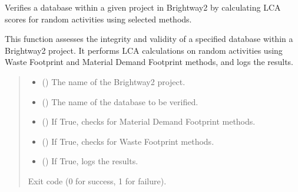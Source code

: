 \documentclass[letterpaper,10pt,english]{sphinxmanual}
\begin{document}
\begin{fulllineitems}
\label{\detokenize{WMFootprint_api:WasteAndMaterialFootprint.VerifyDatabase.VerifyDatabase}}
\pysigstartsignatures
{}
\pysigstopsignatures
\sphinxAtStartPar
Verifies a database within a given project in Brightway2 by calculating LCA scores
for random activities using selected methods.

\sphinxAtStartPar
This function assesses the integrity and validity of a specified database within a Brightway2 project.
It performs LCA calculations on random activities using Waste Footprint and Material Demand Footprint methods,
and logs the results.
\begin{quote}\begin{description}
\begin{itemize}
\item {} 
\sphinxAtStartPar
{} () \textendash{} The name of the Brightway2 project.

\item {} 
\sphinxAtStartPar
{} () \textendash{} The name of the database to be verified.

\item {} 
\sphinxAtStartPar
{} () \textendash{} If True, checks for Material Demand Footprint methods.

\item {} 
\sphinxAtStartPar
{} () \textendash{} If True, checks for Waste Footprint methods.

\item {} 
\sphinxAtStartPar
{} () \textendash{} If True, logs the results.

\end{itemize}

\sphinxAtStartPar
Exit code (0 for success, 1 for failure).

\end{description}\end{quote}

\end{fulllineitems}
\end{document}
